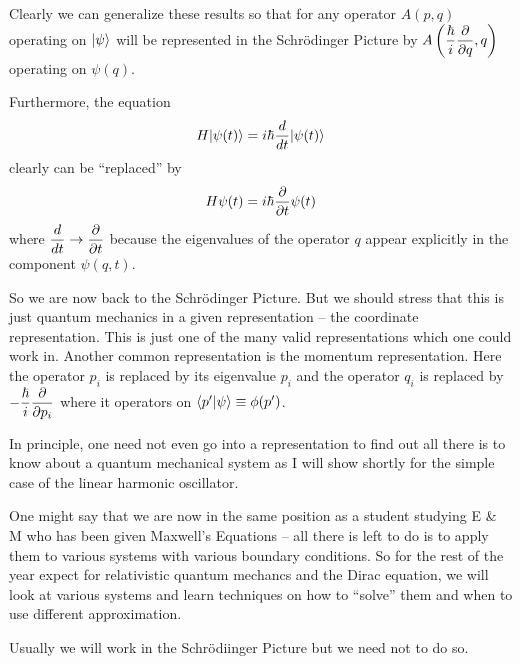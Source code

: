 Clearly we can generalize these results so that for any operator $A(p,q)$ operating on $|\psi\rangle$ will be represented in the Schr\"odinger Picture by $\displaystyle A\left( {\hbar\over i} {\partial\over\partial q}, q\right)$ operating 
on $\psi(q)$. 

Furthermore, the equation 
$$H|\psi(t)\rangle = i\hbar{d\over dt}|\psi(t)\rangle$$ clearly can be ``replaced'' by 
$$H \psi(t) = i\hbar{\partial \over \partial t} \psi(t)$$ where $\displaystyle {d\over dt} \rightarrow {\partial \over \partial t}$ because the eigenvalues of the operator $q$ appear explicitly in the component $\psi(q,t)$. 

So we are now back to the Schr\"odinger Picture. But we should stress that this is just quantum mechanics in a given representation -- the coordinate representation. This is just one of the many valid
representations which one could work in. Another common representation is the momentum representation. Here the operator $p_i$ is replaced by its eigenvalue $p_i$ and the 
operator $q_i$ is replaced by $\displaystyle -{\hbar\over i}{\partial \over \partial p_i}$ where it operators on $\langle p'|\psi\rangle \equiv \phi(p')$. 

In principle, one need not even go into a representation to find out all there is to know about a quantum mechanical system as I will show shortly for the simple case of the linear harmonic oscillator.

One might say that we are now in the same position as a student studying E \& M who has been given Maxwell's Equations -- all there is left to do is to apply them to various systems with 
various boundary conditions. So for the rest of the year expect for relativistic quantum mechancs and the Dirac equation, we will look at various systems and learn techniques on how to ``solve'' them and
when to use different approximation. 

Usually we will work in the Schr\"odiinger Picture but we need not to do so. 







